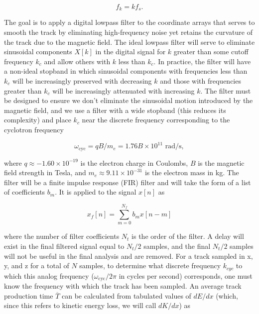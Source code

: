 \documentclass{JINST}
\begin{document}
\begin{equation}
f_{k} = kf_{s}.
\end{equation}

The goal is to apply a digital lowpass filter to the coordinate arrays that serves to
smooth the track by eliminating high-frequency noise yet retains the curvature of the track
due to the magnetic field.  The ideal lowpass filter will serve to eliminate sinusoidal components
$X[k]$ in the digital signal for $k$ greater than some cutoff frequency $k_{c}$ and allow 
others with $k$ less than $k_{c}$.  In practice, the filter will have a non-ideal stopband in which sinusoidal 
components with frequencies less than $k_{c}$ will be increasingly preserved with decreasing $k$ and those 
with frequencies greater than $k_{c}$ will be increasingly attenuated with increasing $k$.  The filter must be 
designed to ensure we don't eliminate the sinusoidal motion introduced by the magnetic field, and we use a
filter with a wide stopband (this reduces its complexity) and place $k_{c}$ near the discrete frequency 
corresponding to the cyclotron frequency


\begin{equation}\label{eqn_wcyc}
\omega_{\mathrm{cyc}} = qB/m_{e} = 1.76B \times 10^{11} \,\, \mathrm{rad/s},
\end{equation}

\noindent where $q \approx -1.60 \times 10^{-19}$ is the electron charge in Coulombs, $B$ is the magnetic field
strength in Tesla, and $m_{e} \approx 9.11 \times 10^{-31}$ is the electron mass in kg.  The filter will be a finite impulse response (FIR) filter and will take the form of a  list of coefficients $b_{m}$.  It is applied to the signal $x[n]$ as

\begin{equation}
x_{f}[n] = \sum_{m=0}^{N_f} b_{m}x[n-m]
\end{equation}

\noindent where the number of filter coefficients $N_{t}$ is the order of the filter.  A delay will exist in the
final filtered signal equal to $N_{t}/2$ samples, and the final $N_{t}/2$ samples will not be useful in the final analysis and are removed.
For a track sampled in x, y, and z for a total of $N$ samples, to determine what discrete frequency $k_{cyc}$ to which this analog frequency ($\omega_{\mathrm{cyc}}/2\pi$ in cycles per second) corresponds, one must know the frequency with which the track has been sampled.  An average track production time $\overline{T}$ can be calculated from tabulated values of $dE/dx$ (which, since this refers to kinetic energy loss, we will call $dK/dx$) as
\end{document}
